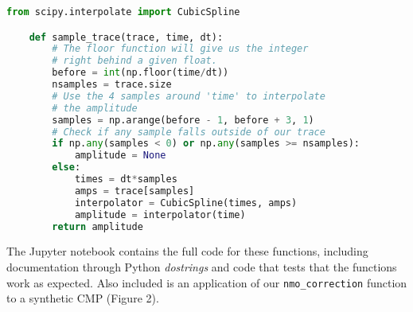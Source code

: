 \begin{lstlisting}[language=python]
    from scipy.interpolate import CubicSpline

    def sample_trace(trace, time, dt):
        # The floor function will give us the integer
        # right behind a given float.
        before = int(np.floor(time/dt))
        nsamples = trace.size
        # Use the 4 samples around 'time' to interpolate
        # the amplitude
        samples = np.arange(before - 1, before + 3, 1)
        # Check if any sample falls outside of our trace
        if np.any(samples < 0) or np.any(samples >= nsamples):
            amplitude = None
        else:
            times = dt*samples
            amps = trace[samples]
            interpolator = CubicSpline(times, amps)
            amplitude = interpolator(time)
        return amplitude
\end{lstlisting}

The Jupyter notebook contains the full code for these functions, including
documentation through Python \textit{dostrings} and code that tests that the
functions work as expected.
Also included is an application of our \texttt{nmo\_correction} function to a
synthetic CMP (Figure 2).

